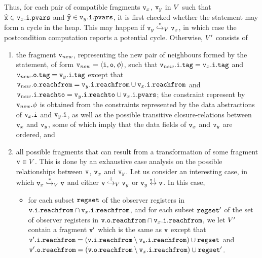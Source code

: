 Thus, for each pair of compatible fragments $\frag_x$, $\frag_y$ in $\fragset$ such that $\abstrof{\lvarof{x}} \in \pvarsat{\inof{\frag_x}}$ and $\abstrof{\lvarof{y}} \in \pvarsat{\inof{\frag_y}}$, it is first checked whether the statement may form
a cycle in the heap. This may happen if
$\frag_y \overset{*}\hookrightarrow_{\fragset}\frag_x$, in which case the postcondition computation reports a potential cycle.
Otherwise, $\fragsetpost$ consists of
\begin{enumerate}
  \item
    the fragment $\frag_{new}$, representing
    the new pair of neighbours formed by the statement, of form
    $\frag_{new} = \fragtupleat{\frag_{new}}$, such that
    $\tagat{\inof{\frag_{new}}} = \tagat{\inof{\frag_x}}$ and
    $\tagat{\outof{\frag_{new}}} = \tagat{\inof{\frag_y}}$ except that
    $\reachfromat{\outof{\frag_{new}}} = \reachfromat{\inof{\frag_y}} \cup \reachfromat{\inof{\frag_x}}$ and
    $\reachtoat{\inof{\frag_{new}}} = \reachtoat{\inof{\frag_y}} \cup \pvarsat{\inof{\frag_x}}$;
    the constraint represent by $\datarelof{\frag_{new}}$ is obtained from
    the constraints represented by the data abstractions of $\inof{\frag_x}$ and
    $\inof{\frag_y}$, as well as 
    the possible transitive closure-relations between
    $\frag_x$ and $\frag_y$, some of which imply that the data fields of
    $\frag_x$ and $\frag_y$ are ordered, and
  \item
all possible fragments that can result from a transformation
of some fragment $\frag \in \fragset$. This is done by an exhaustive
case analysis on the possible
relationships between $\frag$, $\frag_x$ and $\frag_y$.
Let us consider an interesting case, in which
$\frag_x \overset{*}\hookrightarrow_{\fragset} \frag$ and either $\frag \overset{+}\hookrightarrow_{\fragset} \frag_y$ or $\frag_y \overset{*+}\leftrightarrow \frag$.
In this case, 
\begin{itemize}
\item
  for each subset $\regset$ of the observer registers in $\reachfromat{\inof{\frag}} \cap \reachfromat{\inof{\frag_x}}$, and for each subset $\regset'$ of the set of observer registers in
  $\reachfromat{\outof{\frag}} \cap \reachfromat{\inof{\frag_x}}$,
  we let $\fragsetpost$ contain a fragment $\frag'$ which is the same as $\frag$
  except that
$\reachfromat{\inof{\frag'}} = (\tt \reachfromat{\inof{\frag}} \setminus \reachfromat{\inof{\frag_x}}) \cup \regset$ and $\reachfromat{\outof{\frag'}} = (\reachfromat{\outof{\frag}} \setminus \reachfromat{\inof{\frag_x}}) \cup \regset'$. 

\end{itemize}
\end{enumerate}
